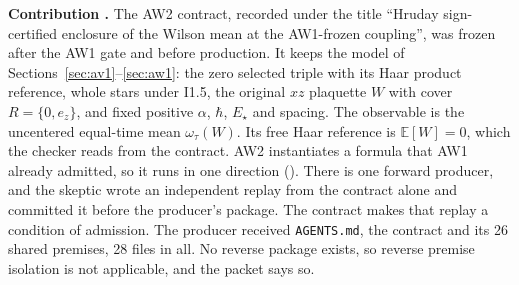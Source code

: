 \textbf{Contribution .} The AW2 contract, recorded under
the title ``Hruday sign-certified enclosure of the Wilson mean at the
AW1-frozen coupling'', was frozen after the AW1 gate and before production.
It keeps the model of Sections~\ref{sec:av1}--\ref{sec:aw1}: the zero selected
triple with its Haar product reference, whole stars under I1.5, the original
$xz$ plaquette $W$ with cover $R=\{0,e_z\}$, and fixed positive $\alpha$,
$\hbar$, $E_\star$ and spacing. The observable is the uncentered equal-time
mean $\omega_\tau(W)$. Its free Haar reference is $\mathbb E[W]=0$, which the
checker reads from the contract. AW2 instantiates a formula that AW1 already
admitted, so it runs in one direction (). There is one
forward producer, and the skeptic wrote an independent replay from the
contract alone and committed it before the producer's package. The contract
makes that replay a condition of admission. The producer received
\texttt{AGENTS.md}, the contract and its 26 shared premises, 28 files in all.
No reverse package exists, so reverse premise isolation is not applicable, and
the packet says so.

